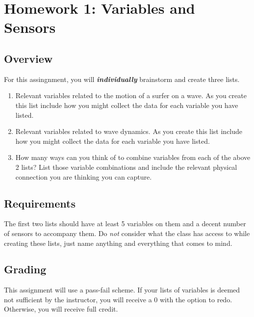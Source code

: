 \documentclass[
	letterpaper, %
	fontsize=10pt, %
	twoside=true, %
	numbers=noenddot, %
]{kaobook}
\begin{document}

\chapter*{Homework 1: Variables and Sensors}

\section*{Overview}
For this assingnment, you will \textbf{\emph{individually}} brainstorm and create three lists.

\begin{enumerate}
	\item Relevant variables related to the motion of a surfer on a wave. 
	As you create this list include how you might collect the data for each variable you have listed.
	\item Relevant variables related to wave dynamics. 
	As you create this list include how you might collect the data for each variable you have listed.
	\item How many ways can you think of to combine variables from each of the above 2 lists? 
	List those variable combinations and include the relevant physical connection you are thinking you can capture. 
\end{enumerate}

\section*{Requirements}
The first two lists should have at least 5 variables on them and a decent number of sensors to accompany them.
Do \emph{not} consider what the class has access to while creating these lists, just name anything and everything that comes to mind.

\section*{Grading}
This assignment will use a pass-fail scheme.
If your lists of variables is deemed not sufficient by the instructor, you will receive a 0 with the option to redo.
Otherwise, you will receive full credit.
\end{document}

